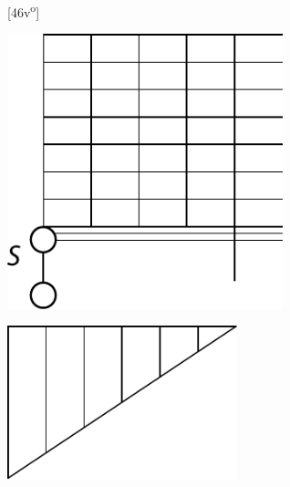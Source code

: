 \pend
% 
  \newpage%
%
%
\pstart%
\noindent
\normalsize
[46v\textsuperscript{o}]
\pend
\pstart\hspace{5mm}
\begin{minipage}[b][30mm][t]{0.5\textwidth}
\includegraphics[width=0.6\textwidth]{gesamttex/edit_VIII,3/images/LH_35_14_02_046v,047v_d4.pdf}
\end{minipage}
\hspace{5mm}
\begin{minipage}[b][30mm][b]{0.5\textwidth}
\includegraphics[width=0.5\textwidth]{gesamttex/edit_VIII,3/images/LH_35_14_02_046v,047v_d5.pdf}
\end{minipage}
